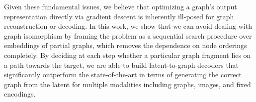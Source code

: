 Given these fundamental issues, we believe that optimizing a graph's output representation directly via gradient descent is inherently
ill-posed for graph reconstruction or decoding.
In this work, we show that we can avoid dealing with graph isomorphism by framing the problem
as a sequential search procedure over embeddings of partial graphs, which removes the dependence on node orderings completely.
By deciding at each step whether a particular graph fragment lies on a path towards the target, we are
able to build latent-to-graph decoders that significantly outperform the state-of-the-art in terms of
generating the correct graph from the latent for multiple modalities including graphs, images, and fixed encodings.
